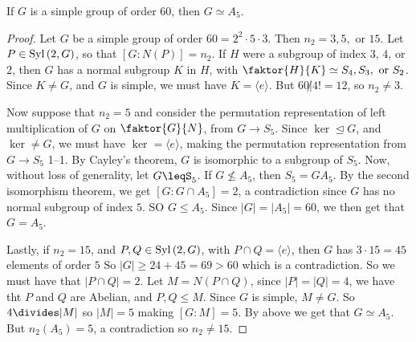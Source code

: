 \begin{theorem}\label{theorem_4.6.2}
  If $G$ is a simple group of order  $60$, then  $G \simeq A_5$.
\end{theorem}
\begin{proof}
  Let $G$ be a simple group of order  $60=2^2 \cdot 5 \cdot 3$. Then
  $n_2=3,5, \text{ or } 15$. Let $P \in \operatorname{Syl}{(2,G)}$, so that $[G:N(P)]=n_2$.
  If $H$ were a subgroup of index $3$, $4$, or $2$, then $G$ has a normal
  subgroup  $K$ in  $H$, with  $\faktor{H}{K} \simeq S_4, S_3, \text{ or
  }S_2$. Since $K \neq G$, and  $G$ is simple, we must have $K=\langle e
  \rangle$. But $60 \not| 4!=12$, so  $n_2 \neq 3$.

  Now suppose that $n_2=5$ and consider the permutation representation of left
  multiplication of $G$ on  $\faktor{G}{N}$, from $G \xrightarrow{} S_5$.
  Since $\ker \unlhd G$, and $\ker \neq G$, we must have $\ker=\langle e
  \rangle$, making the permutation representation from $G \xrightarrow{} S_5$
  1--1. By Cayley's theorem, $G$ is isomorphic to a subgroup of  $S_5$. Now,
  without loss of generality, let $G \leqS_5$. If $G \not\leq A_5$, then
  $S_5=GA_5$. By the second isomorphism theorem, we get $[G: G \cap A_5]=2$, a
  contradiction since $G$ has no normal subgroup of index  $5$. SO  $G \leq
  A_5$. Since $|G|=|A_5|=60$, we then get that $G=A_5$.

  Lastly, if $n_2=15$, and $P,Q \in \operatorname{Syl}{(2,G)}$, with $P \cap Q=\langle e
  \rangle$, then $G$ has  $3 \cdot 15=45$ elements of order $5$ So
  $|G| \geq 24+45=69>60$ which is a contradiction. So we must have that $|P \cap
  Q|=2$. Let  $M=N(P \cap Q)$, since $|P|=|Q|=4$, we have tht $P$ and
  $Q$ are Abelian, and  $P,Q \leq M$. Since  $G$ is simple,  $M \neq G$. So
  $4 \divides |M|$ so $|M|=5$ making $[G:M]=5$. By above we get that $G \simeq
  A_5$. But $n_2(A_5)=5$, a contradiction so $n_2 \neq 15$.
\end{proof}
